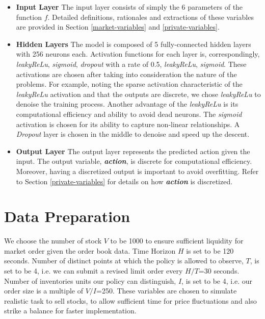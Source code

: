 \documentclass[12pt]{extarticle}
\begin{document}
\begin{itemize}
\item \textbf{Input Layer} The input layer consists of simply the 6 parameters of the function $f$.
Detailed definitions, rationales and extractions of these variables are
provided in Section \ref{market-variables} and \ref{private-variables}.

\item \textbf{Hidden Layers} The model is composed of 5 fully-connected hidden layers with
256 neurons each. Activation functions for each layer is, correspondingly,
\textit{leakyReLu},
\textit{sigmoid}, \textit{dropout} with a rate of 0.5,
\textit{leakyReLu}, \textit{sigmoid}. These activations are
chosen after taking into consideration the nature of the
problems. For example, noting the sparse activation characteristic of
the \textit{leakyReLu} activation and that the outputs are discrete, we chose \textit{leakyReLu}
to denoise the training process. Another advantage of the \textit{leakyReLu}
is its computational efficiency and ability to avoid dead neurons.
The \textit{sigmoid} activation is chosen for its ability to capture
non-linear relationships. A \textit{Dropout} layer is chosen
in the middle to denoise and speed up the descent.

\item \textbf{Output Layer} The output layer represents the predicted action given
the input. The output variable, \textit{\textbf{action}}, is discrete for computational
efficiency. Moreover, having a discretized output is important to avoid overfitting.
Refer to Section \ref{private-variables} for details on how \textit{\textbf{action}}
is discretized.

\end{itemize}


\section{Data Preparation}
We choose the number of stock $V$ to be 1000 to ensure sufficient liquidity for market order given the order book data.
Time Horizon $H$ is set to be 120 seconds. Number of distinct points at which the policy is allowed to observe, $T$, is set to be 4, i.e. we can submit a revised limit order every $H/T$=30 seconds. Number of inventories units our policy can distinguish, $I$, is set to be 4, i.e. our order size is a multiple of $V/I$=250. These variables are chosen to simulate realistic task to sell stocks, to allow sufficient time for price fluctuations and also strike a balance for faster implementation.
\end{document}
